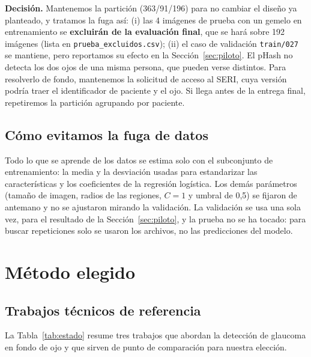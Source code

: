 \documentclass[pdflatex,sn-mathphys-num]{sn-jnl}%
\theoremstyle{thmstyleone}%
\theoremstyle{thmstyletwo}%
\theoremstyle{thmstylethree}%
\begin{document}
\textbf{Decisión.} Mantenemos la partición (363/91/196) para no cambiar el diseño ya planteado, y tratamos la fuga así: (i) las 4 imágenes de prueba con un gemelo en entrenamiento se \textbf{excluirán de la evaluación final}, que se hará sobre 192 imágenes (lista en \texttt{prueba\_excluidos.csv}); (ii) el caso de validación \texttt{train/027} se mantiene, pero reportamos su efecto en la Sección~\ref{sec:piloto}. El pHash no detecta los dos ojos de una misma persona, que pueden verse distintos. Para resolverlo de fondo, mantenemos la solicitud de acceso al SERI, cuya versión podría traer el identificador de paciente y el ojo. Si llega antes de la entrega final, repetiremos la partición agrupando por paciente.

\subsection*{Cómo evitamos la fuga de datos}

Todo lo que se aprende de los datos se estima solo con el subconjunto de entrenamiento: la media y la desviación usadas para estandarizar las características y los coeficientes de la regresión logística. Los demás parámetros (tamaño de imagen, radios de las regiones, $C=1$ y umbral de 0,5) se fijaron de antemano y no se ajustaron mirando la validación. La validación se usa una sola vez, para el resultado de la Sección~\ref{sec:piloto}, y la prueba no se ha tocado: para buscar repeticiones solo se usaron los archivos, no las predicciones del modelo.

\section{Método elegido}\label{sec:metodo}

\subsection{Trabajos técnicos de referencia}

La Tabla~\ref{tab:estado} resume tres trabajos que abordan la detección de glaucoma en fondo de ojo y que sirven de punto de comparación para nuestra elección.
\end{document}
